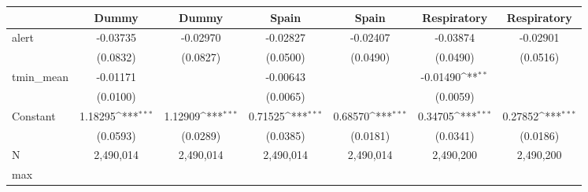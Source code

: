 {
\def\sym#1{\ifmmode^{#1}\else\(^{#1}\)\fi}
\begin{tabular}{l*{6}{c}}
\toprule
            &\multicolumn{1}{c}{Dummy}&\multicolumn{1}{c}{Dummy}&\multicolumn{1}{c}{Spain}&\multicolumn{1}{c}{Spain}&\multicolumn{1}{c}{Respiratory}&\multicolumn{1}{c}{Respiratory}\\
\midrule
alert       &    -0.03735         &    -0.02970         &    -0.02827         &    -0.02407         &    -0.03874         &    -0.02901         \\
            &    (0.0832)         &    (0.0827)         &    (0.0500)         &    (0.0490)         &    (0.0490)         &    (0.0516)         \\
tmin\_mean   &    -0.01171         &                     &    -0.00643         &                     &    -0.01490\sym{**} &                     \\
            &    (0.0100)         &                     &    (0.0065)         &                     &    (0.0059)         &                     \\
Constant    &     1.18295\sym{***}&     1.12909\sym{***}&     0.71525\sym{***}&     0.68570\sym{***}&     0.34705\sym{***}&     0.27852\sym{***}\\
            &    (0.0593)         &    (0.0289)         &    (0.0385)         &    (0.0181)         &    (0.0341)         &    (0.0186)         \\
\midrule
N           &   2,490,014         &   2,490,014         &   2,490,014         &   2,490,014         &   2,490,200         &   2,490,200         \\
max         &                     &                     &                     &                     &                     &                     \\
\bottomrule
\end{tabular}
}
